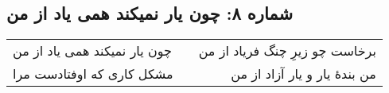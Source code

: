 \begin{center}
\section*{شماره ۸: چون یار نمیکند همی یاد از من}
\label{sec:008}
\begin{longtable}{l p{0.5cm} r}
چون یار نمیکند همی یاد از من
&&
برخاست چو زیرِ چنگ فریاد از من
\\
مشکل کاری که اوفتادست مرا
&&
من بندهٔ یار و یار آزاد از من
\\
\end{longtable}
\end{center}

